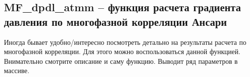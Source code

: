 \subsection{MF\_dpdl\_atmm – функция расчета градиента давления по многофазной корреляции Ансари}  
Иногда бывает удобно/интересно посмотреть детально на результаты расчета по многофазной корреляции. Для этого можно воспользоваться данной функцией. Внимательно смотрите описание и саму функцию. Выводит ряд параметров в массиве.



\begin{comment}

Результатом работы функции является массив, содержащий давления и температуру на концах трубы, калибровочные параметры, а также значения ряда параметров между концами трубы. Вывод значений между концами трубы может быть отключен установкой \texttt{out_curves=False}. При необходимости проведения массовых расчетов можно вывести только одно значение (или одну строку значений) штатными средствами Excel. 

\begin{figure}[ht]
	\center{\texttt{[image: pipe\_out\_example]}}
	\caption{Пример вывода результатов расчета функции \texttt{MF_p_pipe_atma()} для  \texttt{out_curves=True} }
	\label{ris:pipe_out_example}
\end{figure}

\begin{figure}[ht]
	\center{\texttt{[image: pipe\_out\_example\_short]}}
	\caption{Пример вывода результатов расчета функции \texttt{MF_p_pipe_atma()} для  \texttt{out_curves=False} }
	\label{ris:pipe_out_example_short}
\end{figure}

\subsection{MF\_calibr\_pipe, MF\_calibr\_pipeline - функция калибровки расчета участка трубы}

Функция калибровки позволяет настроить модель потока в трубе под замеры давления на концах трубы. Настройка может проводиться за счет подбора различных параметров. Тип калибровки выбирается параметром \texttt{calibr_type} В текущей реализации может быть подобран только один из перечисленных ниже параметров.


\end{comment}
